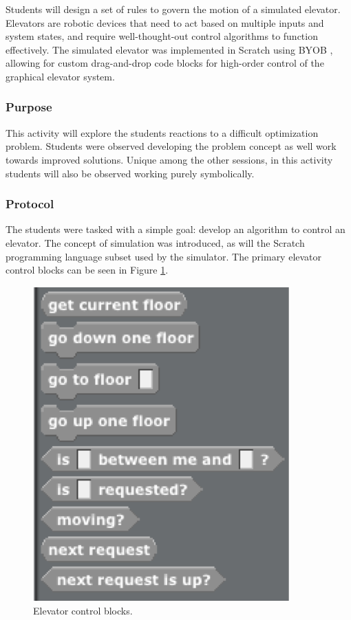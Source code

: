 	Students will design a set of rules to govern the motion of a simulated
	elevator. Elevators are robotic devices that need to act based on
	multiple inputs and system states, and require well-thought-out control
	algorithms to function effectively. The simulated elevator was
	implemented in Scratch \citet{scratch} using BYOB \citet{byob},
	allowing for custom drag-and-drop code blocks for high-order control
	of the graphical elevator system.
	
	
	\subsubsection{Purpose}
	
	This activity will explore the students reactions to a difficult optimization
	problem. Students were observed developing the problem concept
	as well work towards improved solutions. Unique among the other sessions,
	in this activity students will also be observed working purely symbolically.
	
	
	\subsubsection{Protocol}
	
	The students were tasked with a simple goal: develop an algorithm
	to control an elevator. The concept of simulation was introduced,
	as will the Scratch programming language subset used by the simulator.
	The primary elevator control blocks can be seen in Figure \ref{fig:Elevator-blocks}.
	
	\begin{figure}
	\begin{centering}
	\includegraphics{images/elevator_primitives}
	\par\end{centering}
	
	\caption{\label{fig:Elevator-blocks}Elevator control blocks.}
	
	
	
	\end{figure}
	
